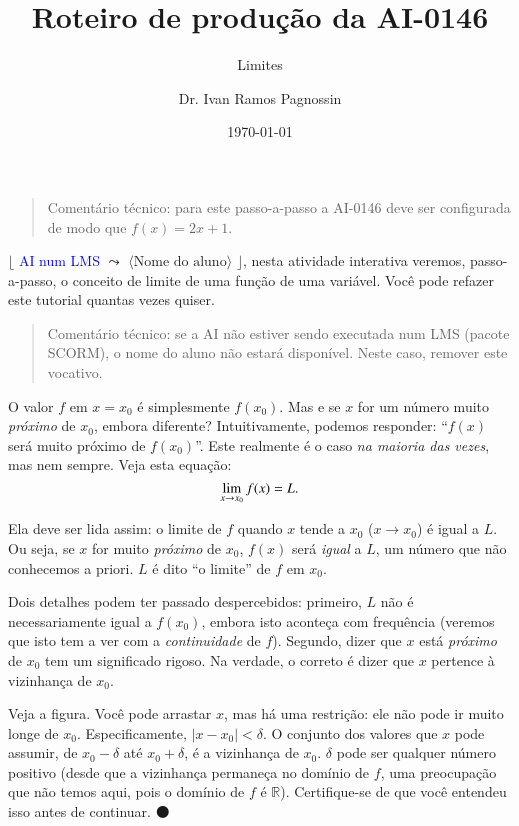 \documentclass[fleqn,12pt]{scrartcl}
\title{Roteiro de produção da AI-0146}
\subtitle{Limites}
\author{Dr. Ivan Ramos Pagnossin}
\date{\today}
\newenvironment{ct}{\begin{quotation}\color{red!30!black}\sffamily\small Comentário técnico: }{\end{quotation}} %
\newcommand\proceed{\textcolor{green!50!black}{$\medbullet$}\xspace}
\newcommand\condicional[2]{$\lfloor$%
	\textsf{\textcolor{blue}{{\footnotesize #1}}}
	$\leadsto$ #2%
	$\rfloor$}
\newcommand\variable[1]{\ensuremath{\langle\text{#1}\rangle}}
\begin{document}
    \maketitle
    
    \begin{ct}
	para este passo-a-passo a AI-0146 deve ser configurada de modo que $f(x) = 2x + 1$.
    \end{ct}

    \condicional{AI num LMS}{\variable{Nome do aluno}}, nesta atividade interativa veremos, passo-a-passo, o conceito de limite de uma função de uma variável. Você pode refazer este tutorial quantas vezes quiser.

    \begin{ct}
	se a AI não estiver sendo executada num LMS (pacote SCORM), o nome do aluno não estará disponível. Neste caso, remover este vocativo.
    \end{ct}

    O valor $f$ em $x = x_0$ é simplesmente $f(x_0)$. Mas e se $x$ for um número muito \emph{próximo} de $x_0$, embora diferente? Intuitivamente, podemos responder: ``$f(x)$ será muito próximo de $f(x_0)$''. Este realmente é o caso \emph{na maioria das vezes}, mas nem sempre. Veja esta equação:
    \begin{equation}\label{eq:limite}
	\lim_{\scriptsize x  \to x_0} f(x) = L.
    \end{equation}

    Ela deve ser lida assim: o limite de $f$ quando $x$ tende a $x_0$ ($x \to x_0$) é igual a $L$. Ou seja, se $x$ for muito \emph{próximo} de $x_0$, $f(x)$ será \emph{igual} a $L$, um número que não conhecemos a priori. $L$ é dito ``o limite'' de $f$ em $x_0$.

    Dois detalhes podem ter passado despercebidos: primeiro, $L$ não é necessariamente igual a $f(x_0)$, embora isto aconteça com frequência (veremos que isto tem a ver com a \emph{continuidade} de $f$). Segundo, dizer que $x$ está \emph{próximo} de $x_0$ tem um significado rigoso. Na verdade, o correto é dizer que $x$ pertence à vizinhança de $x_0$.

    Veja a figura. Você pode arrastar $x$, mas há uma restrição: ele não pode ir muito longe de $x_0$. Especificamente, $|x - x_0| < \delta$. O conjunto dos valores que $x$ pode assumir, de $x_0 - \delta$ até $x_0 + \delta$, é a vizinhança de $x_0$. $\delta$ pode ser qualquer número positivo (desde que a vizinhança permaneça no domínio de $f$, uma preocupação que não temos aqui, pois o domínio de $f$ é $\mathbb{R}$). Certifique-se de que você entendeu isso antes de continuar. \proceed
\end{document}
